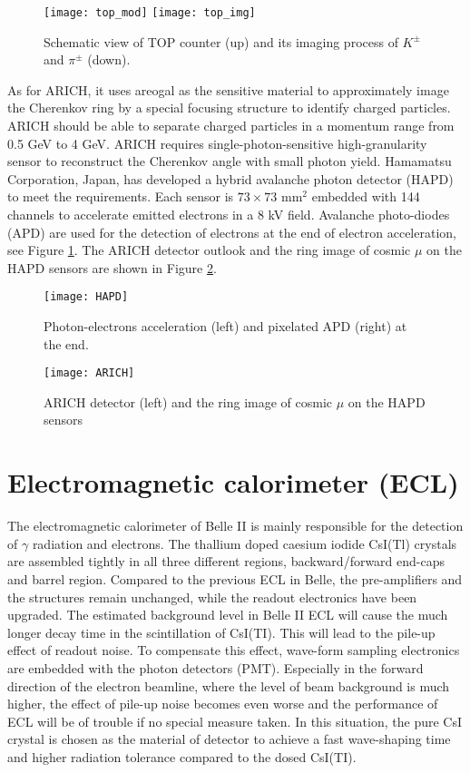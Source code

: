 \begin{figure}[H]
	\centering
	\texttt{[image: top\_mod]}
	\texttt{[image: top\_img]}
	\caption{Schematic view of TOP counter (up) and its imaging process of $K^{\pm}$ and $\pi^{\pm}$ (down)\cite{Abe:2010gxa}.}
\end{figure}

As for ARICH, it uses areogal as the sensitive material to approximately image the Cherenkov ring by a special focusing structure to identify charged particles. ARICH should be able to separate charged particles in a momentum range from 0.5 GeV to 4 GeV. ARICH requires single-photon-sensitive  high-granularity sensor to reconstruct the Cherenkov angle with small photon yield. Hamamatsu Corporation, Japan, has developed a hybrid avalanche photon detector (HAPD) to meet the requirements. Each sensor is $73 \times 73$ mm$^2$ embedded with 144 channels to accelerate emitted electrons in a 8 kV field. Avalanche photo-diodes (APD) are used for the detection of electrons at the end of electron acceleration, see Figure \ref{fig:arich_img}. The ARICH detector outlook and the ring image of cosmic $\mu$ on the HAPD sensors are shown in Figure \ref{fig:HAPD}.

\begin{figure}[H]
	\centering
	\texttt{[image: HAPD]}
	\caption{Photon-electrons acceleration (left) and pixelated APD (right) at the end\cite{Abe:2010gxa}.}
	\label{fig:arich_img}
\end{figure}



\begin{figure}[H]
	\centering
	\texttt{[image: ARICH]}
	\caption{ARICH detector (left) and the ring image of cosmic $\mu$ on the HAPD sensors\cite{b2book}}
	\label{fig:HAPD}
\end{figure}

\section{Electromagnetic calorimeter (ECL)}
The electromagnetic calorimeter of Belle II is mainly responsible for the detection of $\gamma$ radiation and electrons. The  thallium doped caesium iodide CsI(Tl) crystals are assembled tightly in all three different regions, backward/forward end-caps and barrel region. Compared to the previous ECL in Belle, the pre-amplifiers and the structures remain unchanged, while the readout  electronics have been upgraded. The estimated background level in Belle II ECL will cause the much longer decay time in the scintillation of CsI(TI). This will lead to the pile-up effect of readout noise. To compensate this effect, wave-form sampling electronics are embedded with the photon detectors (PMT). Especially in the forward direction of the electron beamline, where the level of beam background is much higher, the effect of pile-up noise becomes even worse and the performance of ECL will be of trouble if no special measure taken. In this situation, the pure CsI crystal is chosen as the material of detector to achieve a fast wave-shaping time and higher radiation tolerance compared to the dosed CsI(TI). 

